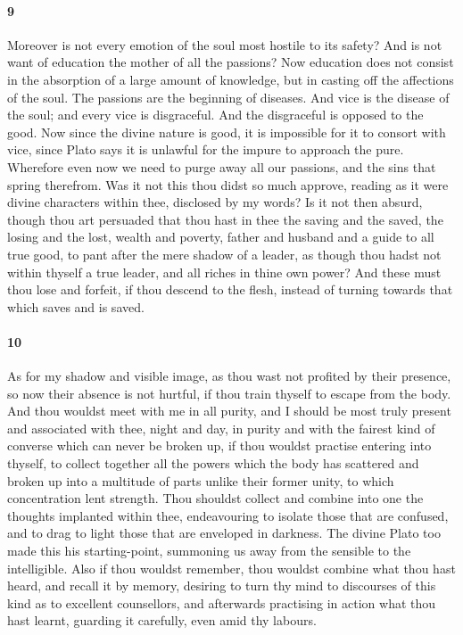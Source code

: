 \documentclass[12pt]{article}
\begin{document}
\paragraph{9} Moreover is not every emotion of the soul most hostile to its
safety? And is not want of education the mother of all the passions? Now
education does not consist in the absorption of a large amount of knowledge,
but in casting off the affections of the soul. The passions are the beginning
of diseases. And vice is the disease of the soul; and every vice is
disgraceful. And the disgraceful is opposed to the good. Now since the divine
nature is good, it is impossible for it to consort with vice, since Plato says
it is unlawful for the impure to approach the pure. Wherefore even now we need
to purge away all our passions, and the sins that spring therefrom. Was it not
this thou didst so much approve, reading as it were divine characters within
thee, disclosed by my words? Is it not then absurd, though thou art persuaded
that thou hast in thee the saving and the saved, the losing and the lost,
wealth and poverty, father and husband and a guide to all true good, to pant
after the mere shadow of a leader, as though thou hadst not within thyself a
true leader, and all riches in thine own power? And these must thou lose and
forfeit, if thou descend to the flesh, instead of turning towards that which
saves and is saved.

\paragraph{10} As for my shadow and visible image, as thou wast not profited by
their presence, so now their absence is not hurtful, if thou train thyself to
escape from the body. And thou wouldst meet with me in all purity, and I should
be most truly present and associated with thee, night and day, in purity and
with the fairest kind of converse which can never be broken up, if thou wouldst
practise entering into thyself, to collect together all the powers which the
body has scattered and broken up into a multitude of parts unlike their former
unity, to which concentration lent strength. Thou shouldst collect and combine
into one the thoughts implanted within thee, endeavouring to isolate those that
are confused, and to drag to light those that are enveloped in darkness. The
divine Plato too made this his starting-point, summoning us away from the
sensible to the intelligible. Also if thou wouldst remember, thou wouldst
combine what thou hast heard, and recall it by memory, desiring to turn thy
mind to discourses of this kind as to excellent counsellors, and afterwards
practising in action what thou hast learnt, guarding it carefully, even amid
thy labours.
\end{document}
